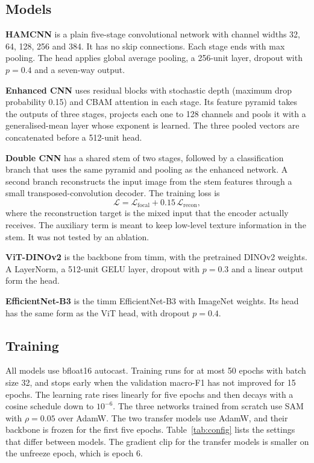 \documentclass[10pt,twocolumn]{article}
\newcommand{\code}[1]{\texttt{\detokenize{#1}}}
\begin{document}
\subsection{Models}
\textbf{HAMCNN} is a plain five-stage convolutional network with channel widths 32, 64, 128, 256 and 384. It has no skip connections. Each stage ends with max pooling. The head applies global average pooling, a 256-unit layer, dropout with $p=0.4$ and a seven-way output.

\textbf{Enhanced CNN} uses residual blocks with stochastic depth (maximum drop probability 0.15) and CBAM attention in each stage. Its feature pyramid takes the outputs of three stages, projects each one to 128 channels and pools it with a generalised-mean layer whose exponent is learned. The three pooled vectors are concatenated before a 512-unit head.

\textbf{Double CNN} has a shared stem of two stages, followed by a classification branch that uses the same pyramid and pooling as the enhanced network. A second branch reconstructs the input image from the stem features through a small transposed-convolution decoder. The training loss is
\begin{equation}
  \mathcal{L} = \mathcal{L}_{\mathrm{focal}} + 0.15\,\mathcal{L}_{\mathrm{recon}},
\end{equation}
where the reconstruction target is the mixed input that the encoder actually receives. The auxiliary term is meant to keep low-level texture information in the stem. It was not tested by an ablation.

\textbf{ViT-DINOv2} is the \code{vit_small_patch14_dinov2} backbone from timm, with the pretrained DINOv2 weights. A LayerNorm, a 512-unit GELU layer, dropout with $p=0.3$ and a linear output form the head.

\textbf{EfficientNet-B3} is the timm EfficientNet-B3 with ImageNet weights. Its head has the same form as the ViT head, with dropout $p=0.4$.

\subsection{Training}
All models use bfloat16 autocast. Training runs for at most 50 epochs with batch size 32, and stops early when the validation macro-F1 has not improved for 15 epochs. The learning rate rises linearly for five epochs and then decays with a cosine schedule down to $10^{-6}$. The three networks trained from scratch use SAM with $\rho=0.05$ over AdamW. The two transfer models use AdamW, and their backbone is frozen for the first five epochs. Table~\ref{tab:config} lists the settings that differ between models. The gradient clip for the transfer models is smaller on the unfreeze epoch, which is epoch 6.
\end{document}
